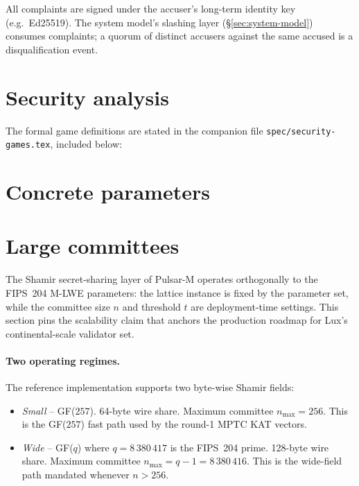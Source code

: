 \documentclass[11pt,a4paper]{article}
\theoremstyle{definition}
\theoremstyle{remark}
\begin{document}
All complaints are signed under the accuser's long-term identity key
(e.g.\ Ed25519). The system model's slashing layer
(\S\ref{sec:system-model}) consumes complaints; a quorum of distinct
accusers against the same accused is a disqualification event.

\section{Security analysis}
\label{sec:security}

The formal game definitions are stated in the companion file
\texttt{spec/security-games.tex}, included below:



\section{Concrete parameters}
\label{sec:parameters}



\section{Large committees}
\label{sec:large-committees}

The Shamir secret-sharing layer of Pulsar-M operates orthogonally to
the FIPS~204 M-LWE parameters: the lattice instance is fixed by the
parameter set, while the committee size $n$ and threshold $t$ are
deployment-time settings. This section pins the scalability claim
that anchors the production roadmap for Lux's continental-scale
validator set.

\paragraph{Two operating regimes.}
The reference implementation supports two byte-wise Shamir fields:

\begin{itemize}[leftmargin=*, itemsep=0pt]
\item \emph{Small} -- GF($257$). 64-byte wire share. Maximum
committee $n_{\max} = 256$. This is the GF($257$) fast path used by
the round-1 MPTC KAT vectors.
\item \emph{Wide} -- GF($q$) where $q = 8\,380\,417$ is the FIPS~204
prime. 128-byte wire share. Maximum committee $n_{\max} = q - 1 =
8\,380\,416$. This is the wide-field path mandated whenever
$n > 256$.
\end{itemize}
\end{document}
